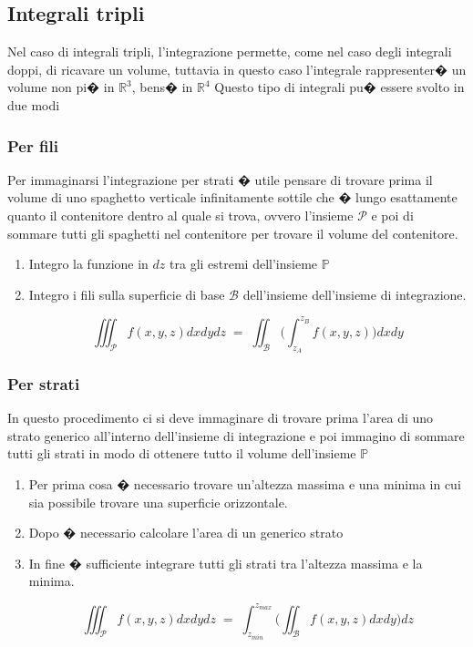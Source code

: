 \documentclass[10pt,a4paper]{report}
\begin{document}
		\subsection*{Integrali tripli}
		Nel caso di integrali tripli, l'integrazione permette, come nel caso degli integrali doppi, di ricavare un volume, tuttavia in questo caso l'integrale rappresenter� un volume non pi� in $ \mathbb{R}^{3} $, bens� in $ \mathbb{R}^{4} $
		Questo tipo di integrali pu� essere svolto in due modi
			\subsubsection{Per fili}
			Per immaginarsi l'integrazione per strati � utile pensare di trovare prima il volume di uno spaghetto verticale infinitamente sottile che � lungo esattamente quanto il contenitore dentro al quale si trova, ovvero l'insieme $\mathcal{P}$ e poi di sommare tutti gli spaghetti nel contenitore per trovare il volume del contenitore.
				\begin{enumerate}
					\item Integro la funzione in $ dz $ tra gli estremi dell'insieme $ \mathbb{P} $
					\item Integro i fili sulla superficie di base $ \mathcal{B} $ dell'insieme dell'insieme di integrazione.
					
					\[ \iiint_{\mathcal{P}} f(x,y,z) dxdydz \; = \; \iint_{\mathcal{B}} \Big(\int_{z_{A}}^{z_{B}} f(x,y,z)\Big) dxdy\]
					
				\end{enumerate}
			\subsubsection{Per strati}
			In questo procedimento ci si deve immaginare di trovare prima l'area di uno strato generico all'interno dell'insieme di integrazione e poi immagino di sommare tutti gli strati in modo di ottenere tutto il volume dell'insieme $ \mathbb{P} $
				\begin{enumerate}
					\item Per prima cosa � necessario trovare un'altezza massima e una minima in cui sia possibile trovare una superficie orizzontale.
					\item Dopo � necessario calcolare l'area di un generico strato
					\item In fine � sufficiente integrare tutti gli strati tra l'altezza massima e la minima.
					
					\[ \iiint_{\mathcal{P}} f(x,y,z) dxdydz \; = \; \int_{z_{min}}^{z_{max}} \Big(\iint_{\mathcal{B}} f(x,y,z) dxdy\Big)dz \]
					
				\end{enumerate}
		
\end{document}
